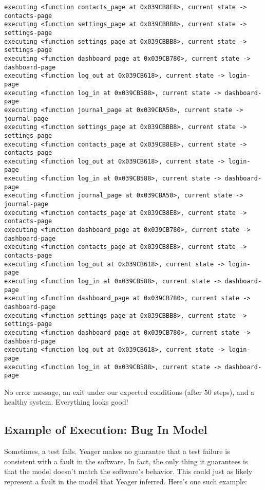 \begin{Verbatim}[fontsize=\small]
executing <function contacts_page at 0x039CB8E8>, current state -> contacts-page
executing <function settings_page at 0x039CBBB8>, current state -> settings-page
executing <function settings_page at 0x039CBBB8>, current state -> settings-page
executing <function dashboard_page at 0x039CB780>, current state -> dashboard-page
executing <function log_out at 0x039CB618>, current state -> login-page
executing <function log_in at 0x039CB588>, current state -> dashboard-page
executing <function journal_page at 0x039CBA50>, current state -> journal-page
executing <function settings_page at 0x039CBBB8>, current state -> settings-page
executing <function contacts_page at 0x039CB8E8>, current state -> contacts-page
executing <function log_out at 0x039CB618>, current state -> login-page
executing <function log_in at 0x039CB588>, current state -> dashboard-page
executing <function journal_page at 0x039CBA50>, current state -> journal-page
executing <function contacts_page at 0x039CB8E8>, current state -> contacts-page
executing <function dashboard_page at 0x039CB780>, current state -> dashboard-page
executing <function contacts_page at 0x039CB8E8>, current state -> contacts-page
executing <function log_out at 0x039CB618>, current state -> login-page
executing <function log_in at 0x039CB588>, current state -> dashboard-page
executing <function dashboard_page at 0x039CB780>, current state -> dashboard-page
executing <function settings_page at 0x039CBBB8>, current state -> settings-page
executing <function dashboard_page at 0x039CB780>, current state -> dashboard-page
executing <function log_out at 0x039CB618>, current state -> login-page
executing <function log_in at 0x039CB588>, current state -> dashboard-page
\end{Verbatim}

No error message, an exit under our expected conditions (after 50 steps), and a healthy system. Everything looks good!

\subsection{Example of Execution: Bug In Model}
Sometimes, a test fails. Yeager makes no guarantee that a test failure is consistent with a fault in the software. In fact, the only thing it guarantees is that the model doesn't match the software's behavior. This could just as likely represent a fault in the model that Yeager inferred. Here's one such example:

